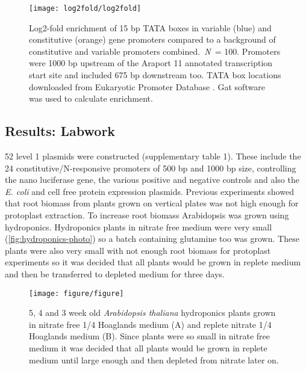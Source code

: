 \begin{figure}[!h]
\begin{center}
\capstart
\texttt{[image: log2fold/log2fold]}
\caption{Log2\hyp{}fold enrichment of 15 bp TATA boxes in variable (blue) and constitutive (orange) gene promoters compared to a background of
constitutive and variable promoters combined.~\textit{N~}= 100. Promoters were 1000 bp upstream of the Araport 11 \autocite{chengAraport11CompleteReannotation2017} annotated
transcription start site and included 675 bp downstream too. TATA box
locations downloaded from Eukaryotic Promoter Database
\autocite{dreosInfluenceRotationalNucleosome2016}. Gat software~\autocite{hegerGATSimulationFramework2013} was used to calculate enrichment.
\label{fig:enrichment}
}
\end{center}
\end{figure}

\subsection{Results: Labwork}
52 level 1 plasmids were constructed (supplementary table 1). These
include the 24 constitutive\fshyp{}N\hyp{}responsive promoters of 500 bp and 1000 bp size, controlling the nano luciferase gene, the various positive and negative controls and also the \textit{E. coli} and cell free protein expression plasmids. Previous experiments showed that root biomass from plants grown on vertical plates was not high enough for protoplast extraction. To increase root biomass Arabidopsis was grown using hydroponics. Hydroponics plants in nitrate free medium were very small (\autoref{fig:hydroponics-photo}) so a batch containing glutamine
too was grown. These plants were also very small with not enough root
biomass for protoplast experiments so it was decided that all plants
would be grown in replete medium and then be transferred to depleted
medium for three days.
\begin{figure}[!h]
\begin{center}
\capstart
\texttt{[image: figure/figure]}
\caption{
5, 4 and 3 week old \textit{Arabidopsis thaliana} hydroponics plants grown in nitrate free 1/4 Hoaglands medium (A) and replete nitrate 1/4 Hoaglands medium (B). Since plants were so small in nitrate free medium it was decided that all plants would be grown in replete medium until large enough and then depleted from nitrate later on.
\label{fig:hydroponics-photo}
}
\end{center}
\end{figure}

